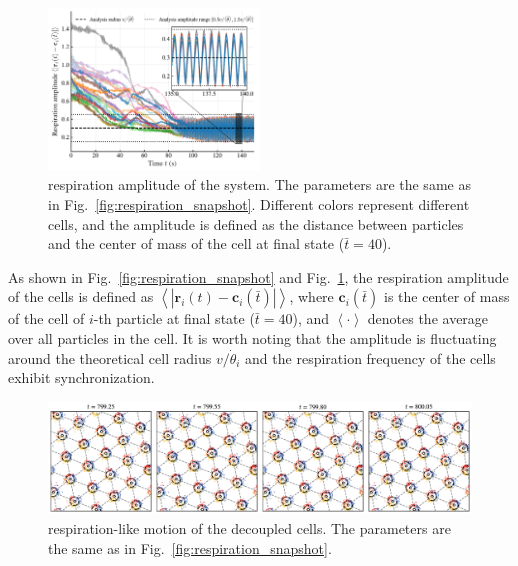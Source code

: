 \documentclass{article}
\begin{document}
\begin{figure}[H]
    \centering
    \includegraphics[width=0.5\textwidth]{./figs/respiration_amplitude_inset.pdf}
    \caption{
        \label{fig:respiration_amplitude}
        respiration amplitude of the system. 
        The parameters are the same as in Fig.~\ref{fig:respiration_snapshot}.
        Different colors represent different cells, and the amplitude is defined as the distance between particles and the center of mass of the cell at final state ($\bar{t}=40$).
    }
\end{figure}
As shown in Fig.~\ref{fig:respiration_snapshot} and Fig.~\ref{fig:respiration_amplitude}, the respiration amplitude of the cells is defined as $\left< \left| \mathbf{r}_i\left( t \right) -\mathbf{c}_i\left( \bar{t} \right) \right| \right> $, where $\mathbf{c}_i(\bar{t})$ is the center of mass of the cell of $i$-th particle at final state ($\bar{t}=40$), and $\left< \cdot \right>$ denotes the average over all particles in the cell. It is worth noting that the amplitude is fluctuating around the theoretical cell radius $v/\dot{\theta}_i$ and the
respiration frequency of the cells exhibit synchronization.

\begin{figure}[H]
    \centering
    \includegraphics[width=\textwidth]{./figs/respiration_snapshot_decoupled.pdf}
    \caption{
        respiration-like motion of the decoupled cells. The parameters are the same as in Fig.~\ref{fig:respiration_snapshot}.
    }
\end{figure}
\end{document}
